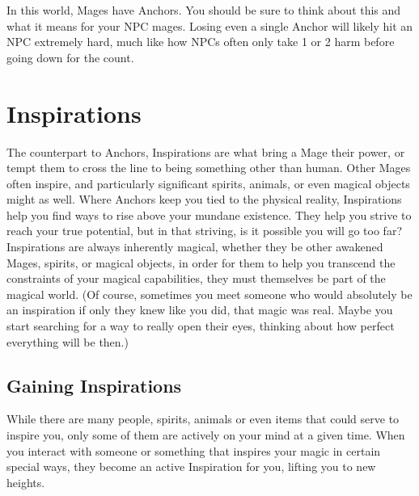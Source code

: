 \documentclass[
  oneside,
  statementpaper,
  9pt]{memoir}
\begin{document}
\begin{MC}

In this world, Mages have Anchors. You should be sure to think about this and what it means for your NPC mages. Losing even a single Anchor will likely hit an NPC extremely hard, much like how NPCs often only take 1 or 2 harm before going down for the count. 

\end{MC}

\hypertarget{inspirations}{%
\section{Inspirations}\label{inspirations}}

\begin{Player}

The counterpart to Anchors, Inspirations are what bring a Mage their power, or tempt them to cross the line to being something other than human. Other Mages often inspire, and particularly significant spirits, animals, or even magical objects might as well. Where Anchors keep you tied to the physical reality, Inspirations help you find ways to rise above your mundane existence. They help you strive to reach your true potential, but in that striving, is it possible you will go too far? Inspirations are always inherently magical, whether they be other awakened Mages, spirits, or magical objects, in order for them to help you transcend the constraints of your magical capabilities, they must themselves be part of the magical world. (Of course, sometimes you meet someone who would absolutely be an inspiration if only they knew like you did, that magic was real. Maybe you start searching for a way to really open their eyes, thinking about how perfect everything will be then.)

\end{Player}

\hypertarget{gaining-inspirations}{%
\subsection{Gaining Inspirations}\label{gaining-inspirations}}

\begin{Player}

While there are many people, spirits, animals or even items that could serve to inspire you, only some of them are actively on your mind at a given time. When you interact with someone or something that inspires your magic in certain special ways, they become an active Inspiration for you, lifting you to new heights. 

\end{Player}
\end{document}
